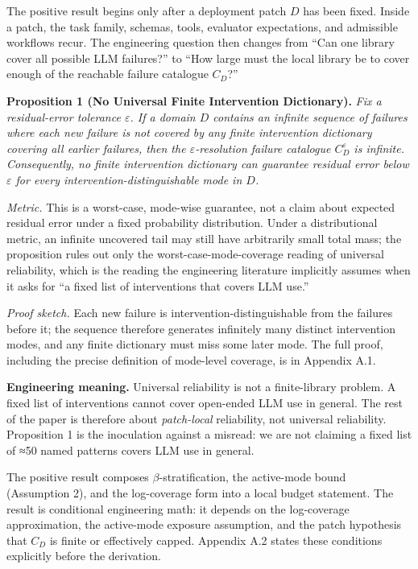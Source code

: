 \documentclass[
]{article}
\begin{document}
The positive result begins only after a deployment patch \(D\) has been
fixed. Inside a patch, the task family, schemas, tools, evaluator
expectations, and admissible workflows recur. The engineering question
then changes from ``Can one library cover all possible LLM failures?''
to ``How large must the local library be to cover enough of the
reachable failure catalogue \(C_D\)?''

\textbf{Proposition 1 (No Universal Finite Intervention Dictionary).}
\emph{Fix a residual-error tolerance \(\varepsilon\). If a domain \(D\)
contains an infinite sequence of failures where each new failure is not
covered by any finite intervention dictionary covering all earlier
failures, then the \(\varepsilon\)-resolution failure catalogue
\(C_D^{\varepsilon}\) is infinite. Consequently, no finite intervention
dictionary can guarantee residual error below \(\varepsilon\) for every
intervention-distinguishable mode in \(D\).}

\emph{Metric.} This is a worst-case, mode-wise guarantee, not a claim
about expected residual error under a fixed probability distribution.
Under a distributional metric, an infinite uncovered tail may still have
arbitrarily small total mass; the proposition rules out only the
worst-case-mode-coverage reading of universal reliability, which is the
reading the engineering literature implicitly assumes when it asks for
``a fixed list of interventions that covers LLM use.''

\emph{Proof sketch.} Each new failure is intervention-distinguishable
from the failures before it; the sequence therefore generates infinitely
many distinct intervention modes, and any finite dictionary must miss
some later mode. The full proof, including the precise definition of
mode-level coverage, is in Appendix A.1.

\textbf{Engineering meaning.} Universal reliability is not a
finite-library problem. A fixed list of interventions cannot cover
open-ended LLM use in general. The rest of the paper is therefore about
\emph{patch-local} reliability, not universal reliability. Proposition 1
is the inoculation against a misread: we are not claiming a fixed list
of ≈50 named patterns covers LLM use in general.

The positive result composes \(\beta\)-stratification, the active-mode
bound (Assumption 2), and the log-coverage form into a local budget
statement. The result is conditional engineering math: it depends on the
log-coverage approximation, the active-mode exposure assumption, and the
patch hypothesis that \(C_D\) is finite or effectively capped. Appendix
A.2 states these conditions explicitly before the derivation.
\end{document}
